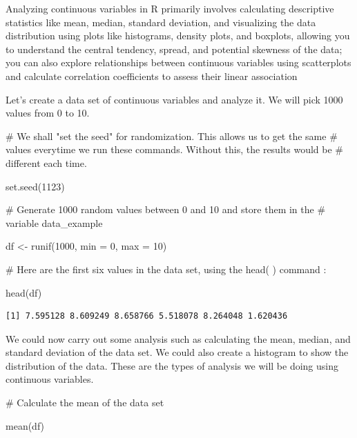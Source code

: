 \documentclass[
  letterpaper,
  DIV=11,
  numbers=noendperiod]{scrreprt}
\newenvironment{Shaded}{\begin{snugshade}}{\end{snugshade}}
\newcommand{\AttributeTok}[1]{\textcolor[rgb]{0.40,0.45,0.13}{#1}}
\newcommand{\CommentTok}[1]{\textcolor[rgb]{0.37,0.37,0.37}{#1}}
\newcommand{\DecValTok}[1]{\textcolor[rgb]{0.68,0.00,0.00}{#1}}
\newcommand{\FunctionTok}[1]{\textcolor[rgb]{0.28,0.35,0.67}{#1}}
\newcommand{\NormalTok}[1]{\textcolor[rgb]{0.00,0.23,0.31}{#1}}
\newcommand{\OtherTok}[1]{\textcolor[rgb]{0.00,0.23,0.31}{#1}}
\begin{document}
Analyzing continuous variables in R primarily involves calculating
descriptive statistics like mean, median, standard deviation, and
visualizing the data distribution using plots like histograms, density
plots, and boxplots, allowing you to understand the central tendency,
spread, and potential skewness of the data; you can also explore
relationships between continuous variables using scatterplots and
calculate correlation coefficients to assess their linear association

Let's create a data set of continuous variables and analyze it. We will
pick 1000 values from 0 to 10.

\begin{Shaded}
\begin{Highlighting}[]
\CommentTok{\# We shall "set the seed" for randomization. This allows us to get the same}
\CommentTok{\# values everytime we run these commands. Without this, the results would be}
\CommentTok{\# different each time.}

\FunctionTok{set.seed}\NormalTok{(}\DecValTok{1123}\NormalTok{)}

\CommentTok{\# Generate 1000 random values between 0 and 10 and store them in the }
\CommentTok{\# variable \textquotesingle{}data\_example\textquotesingle{}}

\NormalTok{df }\OtherTok{\textless{}{-}} \FunctionTok{runif}\NormalTok{(}\DecValTok{1000}\NormalTok{, }\AttributeTok{min =} \DecValTok{0}\NormalTok{, }\AttributeTok{max =} \DecValTok{10}\NormalTok{) }

\CommentTok{\# Here are the first six values in the data set, using the head( ) command :}

\FunctionTok{head}\NormalTok{(df)}
\end{Highlighting}
\end{Shaded}

\begin{verbatim}
[1] 7.595128 8.609249 8.658766 5.518078 8.264048 1.620436
\end{verbatim}

We could now carry out some analysis such as calculating the mean,
median, and standard deviation of the data set. We could also create a
histogram to show the distribution of the data. These are the types of
analysis we will be doing using continuous variables.

\begin{Shaded}
\begin{Highlighting}[]
\CommentTok{\# Calculate the mean of the data set}

\FunctionTok{mean}\NormalTok{(df)}
\end{Highlighting}
\end{Shaded}
\end{document}
